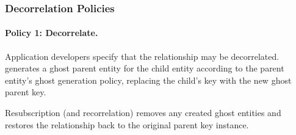 \subsubsection{Decorrelation Policies}

\paragraph{Policy 1: Decorrelate.}
Application developers specify that the relationship may be decorrelated.
\sys{} generates a ghost parent entity for the child entity according to the parent entity's ghost
generation policy, replacing the child's key with the new ghost parent key.

Resubscription (and recorrelation) removes any created ghost entities and restores the relationship
back to the original parent key instance.

%
